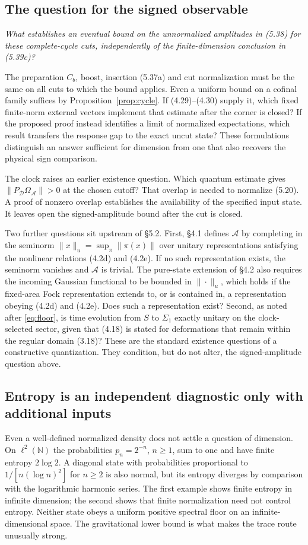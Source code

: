 \documentclass[11pt]{article}
\begin{document}
\subsection{The question for the signed observable}
\emph{What establishes an eventual bound on the unnormalized amplitudes in (5.38) for these complete-cycle cuts, independently of the finite-dimension conclusion in (5.39c)?}

The preparation $C_b$, boost, insertion (5.37a) and cut normalization must be the same on all cuts to which the bound applies. Even a uniform bound on a cofinal family suffices by Proposition~\ref{prop:cycle}. If (4.29)--(4.30) supply it, which fixed finite-norm external vectors implement that estimate after the corner is closed? If the proposed proof instead identifies a limit of normalized expectations, which result transfers the response gap to the exact uncut state? These formulations distinguish an answer sufficient for dimension from one that also recovers the physical sign comparison.

The clock raises an earlier existence question. Which quantum estimate gives $\|P_{\mathcal D}\Omega_{\mathcal A}\|>0$ at the chosen cutoff? That overlap is needed to normalize (5.20). A proof of nonzero overlap establishes the availability of the specified input state. It leaves open the signed-amplitude bound after the cut is closed.

Two further questions sit upstream of \S5.2. First, \S4.1 defines $\mathcal A$ by completing in the seminorm $\|x\|_u=\sup_\pi\|\pi(x)\|$ over unitary representations satisfying the nonlinear relations (4.2d) and (4.2e). If no such representation exists, the seminorm vanishes and $\mathcal A$ is trivial. The pure-state extension of \S4.2 also requires the incoming Gaussian functional to be bounded in $\|\cdot\|_u$, which holds if the fixed-area Fock representation extends to, or is contained in, a representation obeying (4.2d) and (4.2e). Does such a representation exist? Second, as noted after \eqref{eq:floor}, is time evolution from $S$ to $\Sigma_1$ exactly unitary on the clock-selected sector, given that (4.18) is stated for deformations that remain within the regular domain (3.18)? These are the standard existence questions of a constructive quantization. They condition, but do not alter, the signed-amplitude question above.

\subsection{Entropy is an independent diagnostic only with additional inputs}
Even a well-defined normalized density does not settle a question of dimension. On $\ell^2(\mathbb N)$ the probabilities $p_n=2^{-n}$, $n\ge1$, sum to one and have finite entropy $2\log2$. A diagonal state with probabilities proportional to $1/[n(\log n)^2]$ for $n\ge2$ is also normal, but its entropy diverges by comparison with the logarithmic harmonic series. The first example shows finite entropy in infinite dimension; the second shows that finite normalization need not control entropy. Neither state obeys a uniform positive spectral floor on an infinite-dimensional space. The gravitational lower bound is what makes the trace route unusually strong.
\end{document}
